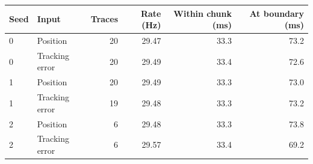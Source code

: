 \begin{tabular}{llrrrr}
\toprule
Seed & Input & Traces & Rate (Hz) & Within chunk (ms) & At boundary (ms) \\
\midrule
0 & Position & 20 & 29.47 & 33.3 & 73.2 \\
0 & Tracking error & 20 & 29.49 & 33.4 & 72.6 \\
1 & Position & 20 & 29.49 & 33.3 & 73.0 \\
1 & Tracking error & 19 & 29.48 & 33.3 & 73.2 \\
2 & Position & 6 & 29.48 & 33.3 & 73.8 \\
2 & Tracking error & 6 & 29.57 & 33.4 & 69.2 \\
\bottomrule
\end{tabular}
